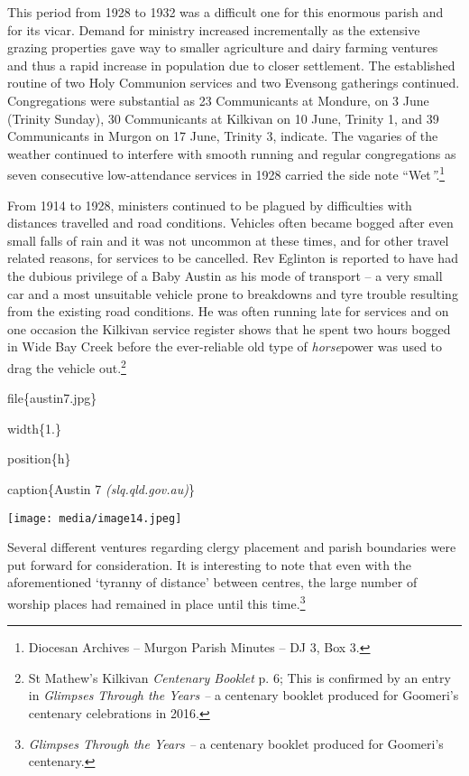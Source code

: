 This period from 1928 to 1932 was a difficult one for this enormous
parish and for its vicar. Demand for ministry increased incrementally as
the extensive grazing properties gave way to smaller agriculture and
dairy farming ventures and thus a rapid increase in population due to
closer settlement. The established routine of two Holy Communion
services and two Evensong gatherings continued. Congregations were
substantial as 23 Communicants at Mondure, on 3 June (Trinity Sunday),
30 Communicants at Kilkivan on 10 June, Trinity 1, and 39 Communicants
in Murgon on 17 June, Trinity 3, indicate. The vagaries of the weather
continued to interfere with smooth running and regular congregations as
seven consecutive low-attendance services in 1928 carried the side note
``Wet\emph{''.}\footnote{Diocesan Archives -- Murgon Parish Minutes --
  DJ 3, Box 3.}

From 1914 to 1928, ministers continued to be plagued by difficulties
with distances travelled and road conditions. Vehicles often became
bogged after even small falls of rain and it was not uncommon at these
times, and for other travel related reasons, for services to be
cancelled. Rev Eglinton is reported to have had the dubious privilege of
a Baby Austin as his mode of transport -- a very small car and a most
unsuitable vehicle prone to breakdowns and tyre trouble resulting from
the existing road conditions. He was often running late for services and
on one occasion the Kilkivan service register shows that he spent two
hours bogged in Wide Bay Creek before the ever-reliable old type of
\emph{horse}power was used to drag the vehicle out.\footnote{St Mathew's
  Kilkivan \emph{Centenary Booklet} p. 6; This is confirmed by an entry
  in \emph{Glimpses Through the Years --} a centenary booklet produced
  for Goomeri's centenary celebrations in 2016.}

file\{austin7.jpg\}

width\{1.\}

position\{h\}

caption\{Austin 7 \emph{(slq.qld.gov.au)}\}

\texttt{[image: media/image14.jpeg]}

Several different ventures regarding clergy placement and parish
boundaries were put forward for consideration. It is interesting to note
that even with the aforementioned `tyranny of distance' between centres,
the large number of worship places had remained in place until this
time.\footnote{\emph{Glimpses Through the Years --} a centenary booklet
  produced for Goomeri's centenary.}

